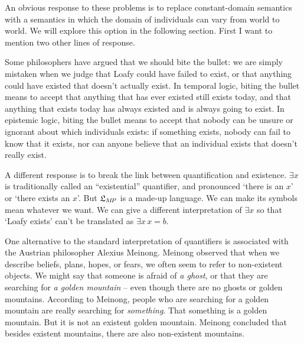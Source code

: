   

An obvious response to these problems is to replace constant-domain semantics
with a semantics in which the domain of individuals can vary from world to
world. We will explore this option in the following section. First I want to
mention two other lines of response.

Some philosophers have argued that we should bite the bullet: we are simply
mistaken when we judge that Loafy could have failed to exist, or that anything
could have existed that doesn't actually exist. In temporal logic, biting the
bullet means to accept that anything that has ever existed still exists today,
and that anything that exists today has always existed and is always going to
exist. In epistemic logic, biting the bullet means to accept that nobody can be
unsure or ignorant about which individuals exists: if something exists, nobody
can fail to know that it exists, nor can anyone believe that an individual
exists that doesn't really exist.


A different response is to break the link between quantification and
existence. $\exists x$ is traditionally called an ``existential'' quantifier,
and pronounced `there is an $x$' or `there exists an $x$'. But $\mathfrak{L}_{M\!P}$ is a
made-up language. We can make its symbols mean whatever we want. We can give a
different interpretation of $\exists x$ so that `Loafy exists' can't be
translated as $\exists x\, x\!=\!b$.

One alternative to the standard interpretation of quantifiers is associated with
the Austrian philosopher Alexius Meinong. Meinong observed that when we describe
beliefs, plans, hopes, or fears, we often seem to refer to non-existent objects.
We might say that someone is afraid of \emph{a ghost}, or that they are
searching for \emph{a golden mountain} -- even though there are no ghosts or
golden mountains. According to Meinong, people who are searching for a golden
mountain are really searching for \emph{something}. That something is a golden
mountain. But it is not an existent golden mountain. Meinong concluded that
besides existent mountains, there are also non-existent mountains.

